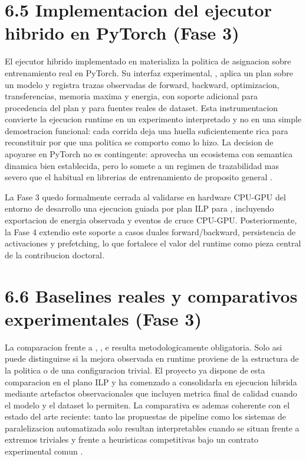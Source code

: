 \section{6.5 Implementacion del ejecutor hibrido en PyTorch (Fase 3)}
El ejecutor hibrido implementado en  materializa la politica de asignacion sobre entrenamiento real en PyTorch. Su interfaz experimental, , aplica un plan sobre un modelo y registra trazas observadas de forward, backward, optimizacion, transferencias, memoria maxima y energia, con soporte adicional para procedencia del plan y para fuentes reales de dataset. Esta instrumentacion convierte la ejecucion runtime en un experimento interpretado y no en una simple demostracion funcional: cada corrida deja una huella suficientemente rica para reconstituir por que una politica se comporto como lo hizo. La decision de apoyarse en PyTorch no es contingente: aprovecha un ecosistema con semantica dinamica bien establecida, pero lo somete a un regimen de trazabilidad mas severo que el habitual en librerias de entrenamiento de proposito general \cite{paszke2019pytorch}.

La Fase 3 quedo formalmente cerrada al validarse en hardware CPU-GPU del entorno de desarrollo una ejecucion guiada por plan ILP para , incluyendo exportacion de energia observada y eventos de cruce CPU-GPU. Posteriormente, la Fase 4 extendio este soporte a casos duales forward/backward, persistencia de activaciones y prefetching, lo que fortalece el valor del runtime como pieza central de la contribucion doctoral.

\section{6.6 Baselines reales y comparativos experimentales (Fase 3)}
La comparacion frente a , ,  e  resulta metodologicamente obligatoria. Solo asi puede distinguirse si la mejora observada en runtime proviene de la estructura de la politica o de una configuracion trivial. El proyecto ya dispone de esta comparacion en el plano ILP y ha comenzado a consolidarla en ejecucion hibrida mediante artefactos observacionales que incluyen metrica final de calidad cuando el modelo y el dataset lo permiten. La comparativa es ademas coherente con el estado del arte reciente: tanto las propuestas de pipeline como los sistemas de paralelizacion automatizada solo resultan interpretables cuando se situan frente a extremos triviales y frente a heuristicas competitivas bajo un contrato experimental comun \cite{huang2019gpipe,narayanan2019pipedream,zheng2022alpa}.

